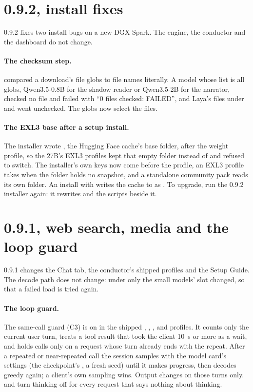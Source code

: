 \section{0.9.2, install fixes}\label{sec:changelog-092}

0.9.2 fixes two install bugs on a new DGX Spark. The engine, the conductor and the dashboard do not change.

\paragraph{The checksum step.}  compared a download's file globs to file names literally. A model whose list is all globs, Qwen3.5-0.8B for the shadow reader or Qwen3.5-2B for the narrator, checked no file and failed with \enquote{0 files checked: FAILED}, and Laya's files under  and  went unchecked. The globs now select the files.

\paragraph{The EXL3 base after a setup install.} The installer wrote , the Hugging Face cache's base folder, after the weight profile, so the 27B's EXL3 profiles kept that empty folder instead of  and  refused to switch. The installer's own keys now come before the profile, an EXL3 profile takes  when the folder holds no snapshot, and a standalone community pack reads its own folder. An install with  writes the cache to  as . To upgrade, run the 0.9.2 installer again: it rewrites  and the scripts beside it.

\section{0.9.1, web search, media and the loop guard}\label{sec:changelog-091}

0.9.1 changes the Chat tab, the conductor's shipped profiles and the Setup Guide. The decode path does not change: under  only the small models' slot changed, so that a failed load is tried again.

\paragraph{The loop guard.} The same-call guard (C3) is on in the shipped , , ,  and  profiles. It counts only the current user turn, treats a tool result that took the client 10~s or more as a wait, and holds calls only on a request whose turn already ends with the repeat. After a repeated or near-repeated call the session samples with the model card's settings (the checkpoint's , a fresh seed) until it makes progress, then decodes greedy again; a client's own sampling wins. Output changes on those turns only.  and  turn thinking off for every request that says nothing about thinking.

